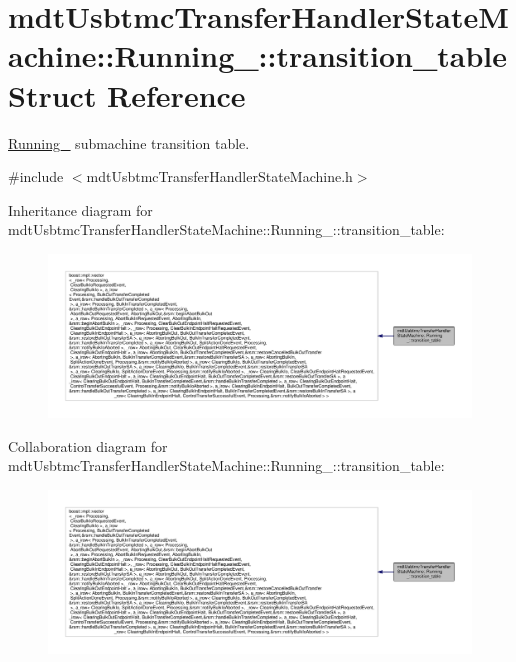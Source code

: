\hypertarget{structmdt_usbtmc_transfer_handler_state_machine_1_1_running___1_1transition__table}{\section{mdt\-Usbtmc\-Transfer\-Handler\-State\-Machine\-:\-:Running\-\_\-\-:\-:transition\-\_\-table Struct Reference}
\label{structmdt_usbtmc_transfer_handler_state_machine_1_1_running___1_1transition__table}
}


\hyperlink{structmdt_usbtmc_transfer_handler_state_machine_1_1_running__}{Running\-\_\-} submachine transition table.  




{\ttfamily \#include $<$mdt\-Usbtmc\-Transfer\-Handler\-State\-Machine.\-h$>$}



Inheritance diagram for mdt\-Usbtmc\-Transfer\-Handler\-State\-Machine\-:\-:Running\-\_\-\-:\-:transition\-\_\-table\-:\nopagebreak
\begin{figure}[H]
\begin{center}
\leavevmode
\includegraphics[width=350pt]{structmdt_usbtmc_transfer_handler_state_machine_1_1_running___1_1transition__table__inherit__graph}
\end{center}
\end{figure}


Collaboration diagram for mdt\-Usbtmc\-Transfer\-Handler\-State\-Machine\-:\-:Running\-\_\-\-:\-:transition\-\_\-table\-:\nopagebreak
\begin{figure}[H]
\begin{center}
\leavevmode
\includegraphics[width=350pt]{structmdt_usbtmc_transfer_handler_state_machine_1_1_running___1_1transition__table__coll__graph}
\end{center}
\end{figure}


